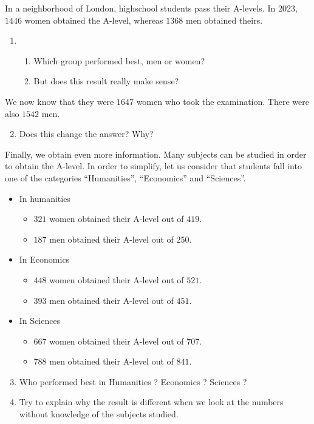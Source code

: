 \documentclass[11pt]{article}
\title{}
\date{}
\author{}
\begin{document}

\noindent In a neighborhood of London, highschool students pass their A-levels. In 2023,
$1446$ women obtained the A-level, whereas $1368$ men obtained theirs. 
\begin{enumerate}
  \item \begin{enumerate}
      \item Which group performed best, men or women?
      \item But does this result really make sense?
    \end{enumerate}
\end{enumerate}
\noindent We now know that they were $1647$ women who took the examination.
There were also $1542$ men.
\begin{enumerate}
\setcounter{enumi}{1}
  \item Does this change the answer? Why?
\end{enumerate}
\noindent Finally, we obtain even more information. Many subjects can be studied
in order to obtain the A-level. In order to simplify, let us consider that
students fall into one of the categories ``Humanities'', ``Economics'' and
``Sciences''.
\begin{itemize}
  \item In humanities \begin{itemize}
      \item $321$ women obtained their A-level out of $419$.
      \item $187$ men obtained their A-level out of $250$.
    \end{itemize}
  \item In Economics
    \begin{itemize}
      \item $448$ women obtained their A-level out of $521$.
      \item $393$ men obtained their A-level out of $451$.
    \end{itemize}
  \item In Sciences \begin{itemize}
      \item $667$ women obtained their A-level out of $707$.
      \item $788$ men obtained their A-level out of $841$.
    \end{itemize}
\end{itemize}
\begin{enumerate}
\setcounter{enumi}{2}
  \item Who performed best in Humanities ? Economics ? Sciences ?
  \item Try to explain why the result is different when we look at the numbers
    without knowledge of the subjects studied.
\end{enumerate}
\end{document}
